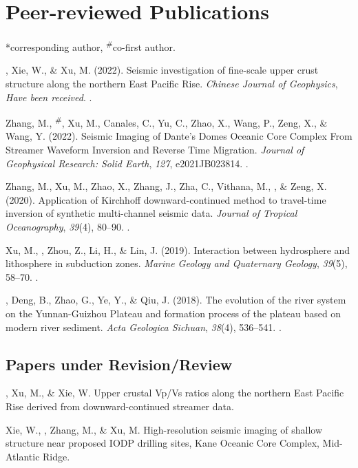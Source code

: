 \section{Peer-reviewed Publications}
\newcommand{\CS}{*} %
\newcommand{\CF}{\textsuperscript{\#}} %

\CS corresponding author, \CF co-first author.
\begin{etaremune}
\item
    \Di, Xie, W., \& Xu, M. (2022).
    Seismic investigation of fine-scale upper crust structure along the northern East Pacific Rise.
    \textit{Chinese Journal of Geophysics}, \textit{Have been received}.
    .
\item
    Zhang, M., \Di\CF, Xu, M., Canales, C., Yu, C., Zhao, X., Wang, P., Zeng, X., \& Wang, Y. (2022).
    Seismic Imaging of Dante's Domes Oceanic Core Complex From Streamer Waveform Inversion and Reverse Time Migration.
    \textit{Journal of Geophysical Research: Solid Earth}, \textit{127}, e2021JB023814.
    .
\item
    Zhang, M., Xu, M., Zhao, X., Zhang, J., Zha, C., Vithana, M., \Di, \& Zeng, X. (2020).
    Application of Kirchhoff downward-continued method to travel-time inversion of synthetic multi-channel seismic data.
    \textit{Journal of Tropical Oceanography}, \textit{39}(4), 80--90.
    .
\item
    Xu, M., \Di, Zhou, Z., Li, H., \& Lin, J. (2019).
    Interaction between hydrosphere and lithosphere in subduction zones.
    \textit{Marine Geology and Quaternary Geology}, \textit{39}(5), 58--70.
    .
\item
    \Di, Deng, B., Zhao, G., Ye, Y., \& Qiu, J. (2018).
    The evolution of the river system on the Yunnan-Guizhou Plateau and formation process of the plateau based on modern river sediment.
    \textit{Acta Geologica Sichuan}, \textit{38}(4), 536--541.
    .
\end{etaremune}

\subsection*{Papers under Revision/Review}
\begin{etaremune}
    \item
    \Di, Xu, M., \& Xie, W.
    Upper crustal Vp/Vs ratios along the northern East Pacific Rise derived from downward-continued streamer data.
\item
    Xie, W., \Di, Zhang, M., \&  Xu, M.
    High-resolution seismic imaging of shallow structure near proposed IODP drilling sites, Kane Oceanic Core Complex, Mid-Atlantic Ridge.
\end{etaremune}

